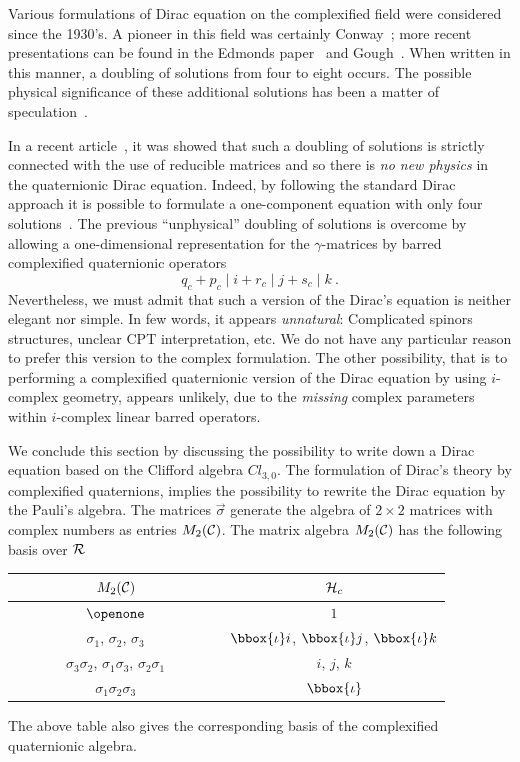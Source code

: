 Various formulations of Dirac equation on the complexified field were 
considered since the 1930's. A pioneer in this field was certainly 
Conway~\cite{CON}; more recent presentations can be found in the 
Edmonds paper~\cite{DS} and Gough~\cite{DS1}. When written in this manner, a 
doubling of solutions from four to eight occurs. The possible physical 
significance of these additional solutions has been a matter of 
speculation~\cite{DS2}.

In a recent article~\cite{D}, it was showed that such a doubling of solutions
is strictly connected with the use of reducible matrices and so there is
{\em no new physics} in the quaternionic Dirac equation. Indeed, 
by following the standard Dirac approach it is possible to formulate a
one-component equation with only four solutions~\cite{D}. 
The previous ``unphysical''
doubling of solutions is overcome by allowing a one-dimensional representation
for the $\gamma$-matrices by barred complexified quaternionic operators
\[ q_c + p_c \mid i + r_c \mid j + s_c \mid k~. \]
Nevertheless, we must admit that such a version of the Dirac's equation is 
neither elegant nor simple. In few words, it appears {\em unnatural}:
Complicated spinors structures, unclear CPT interpretation, etc. We do not 
have any 
particular reason to prefer this version to the complex formulation.
The other possibility, that is to performing a complexified quaternionic 
version of the Dirac equation by using $i$-complex geometry, appears 
unlikely, due
to the {\em missing} complex parameters within $i$-complex linear barred
operators.

We conclude this section by discussing the possibility to write down a Dirac
equation based on the Clifford algebra $Cl_{3,0}$. The formulation of 
Dirac's theory by complexified quaternions, implies the possibility to rewrite
the Dirac equation by the Pauli's algebra.  
The matrices $\vec{\sigma}$ generate the algebra of $2\times 2$ 
matrices with complex numbers as entries $M_2({\cal C})$. The matrix algebra
$M_2({\cal C})$ has the following basis over $\cal R$
\begin{center}
\begin{tabular}{|c|c|} \hline \hline
~~~~~~~~~~$M_2({\cal C})$~~~~~~~~~~ & ~~~~~~~~~~${\cal H}_c$~~~~~~~~~~\\ \hline
$\openone$  &          
$ 1$             \\ 
$\sigma_1$, $\sigma_2$, $\sigma_3$  & 
$\bbox{\iota} i$, $\bbox{\iota} j$, $\bbox{\iota} k$\\
$\sigma_3 \sigma_2$, $\sigma_1 \sigma_3$, $\sigma_2 \sigma_1$ 
 & 
$i$, $j$, $k$\\
$\sigma_1 \sigma_2 \sigma_3$ &  
$\bbox{\iota}$\\ \hline \hline
\end{tabular}
\end{center}
The above table also gives the corresponding basis of the complexified 
quaternionic algebra.


